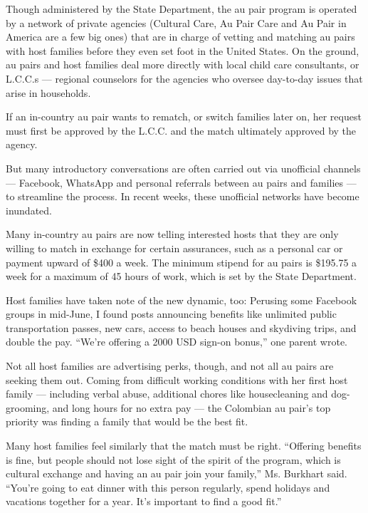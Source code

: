 Though administered by the State Department, the au pair program is
operated by a network of private agencies (Cultural Care, Au Pair Care
and Au Pair in America are a few big ones) that are in charge of vetting
and matching au pairs with host families before they even set foot in
the United States. On the ground, au pairs and host families deal more
directly with local child care consultants, or L.C.C.s --- regional
counselors for the agencies who oversee day-to-day issues that arise in
households.

If an in-country au pair wants to rematch, or switch families later on,
her request must first be approved by the L.C.C. and the match
ultimately approved by the agency.

But many introductory conversations are often carried out via unofficial
channels --- Facebook, WhatsApp and personal referrals between au pairs
and families --- to streamline the process. In recent weeks, these
unofficial networks have become inundated.

Many in-country au pairs are now telling interested hosts that they are
only willing to match in exchange for certain assurances, such as a
personal car or payment upward of \$400 a week. The minimum stipend for
au pairs is \$195.75 a week for a maximum of 45 hours of work, which is
set by the State Department.

Host families have taken note of the new dynamic, too: Perusing some
Facebook groups in mid-June, I found posts announcing benefits like
unlimited public transportation passes, new cars, access to beach houses
and skydiving trips, and double the pay. ``We're offering a 2000 USD
sign-on bonus,'' one parent wrote.

Not all host families are advertising perks, though, and not all au
pairs are seeking them out. Coming from difficult working conditions
with her first host family --- including verbal abuse, additional chores
like housecleaning and dog-grooming, and long hours for no extra pay ---
the Colombian au pair's top priority was finding a family that would be
the best fit.

Many host families feel similarly that the match must be right.
``Offering benefits is fine, but people should not lose sight of the
spirit of the program, which is cultural exchange and having an au pair
join your family,'' Ms. Burkhart said. ``You're going to eat dinner with
this person regularly, spend holidays and vacations together for a year.
It's important to find a good fit.''

